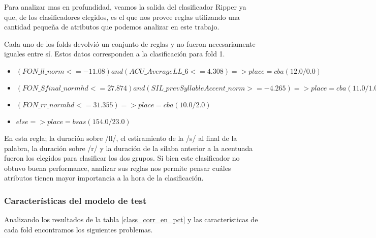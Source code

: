 Para analizar mas en profundidad, veamos la salida del clasificador Ripper ya que, de los clasificadores elegidos, es el que nos provee reglas utilizando una cantidad pequeña de atributos que podemos analizar en este trabajo.

Cada uno de los folds devolvió un conjunto de reglas y no fueron necesariamente iguales entre sí. Estos datos corresponden a la clasificación para fold 1.

\begin{flushleft}
	\begin{itemize}
		
		\item $(FON\_ll\_norm <= -11.08) and (ACU\_AverageLL\_6 <= 4.308) => place=cba (12.0/0.0)$ \\
		\item $(FON\_Sfinal\_normhd <= 27.874) and (SIL\_prevSyllableAccent\_norm >= -4.265) => place=cba (11.0/1.0)$ \\
		\item $(FON\_rr\_normhd <= 31.355) => place=cba (10.0/2.0)$ \\
		\item $ else  => place=bsas (154.0/23.0)$
	\end{itemize}
\end{flushleft}

En esta regla; la duración sobre /ll/, el estiramiento de la /s/ al final de la palabra, la duración sobre /r/ y la duración de la sílaba anterior a la acentuada fueron los elegidos para clasificar los dos grupos. Si bien este clasificador no obtuvo buena performance, analizar sus reglas nos permite pensar cuáles atributos tienen mayor importancia a la hora de la clasificación.

\subsubsection{Características del modelo de test}

Analizando los resultados de la tabla \ref{class_corr_en_pct} y las características de cada fold encontramos los siguientes problemas.

